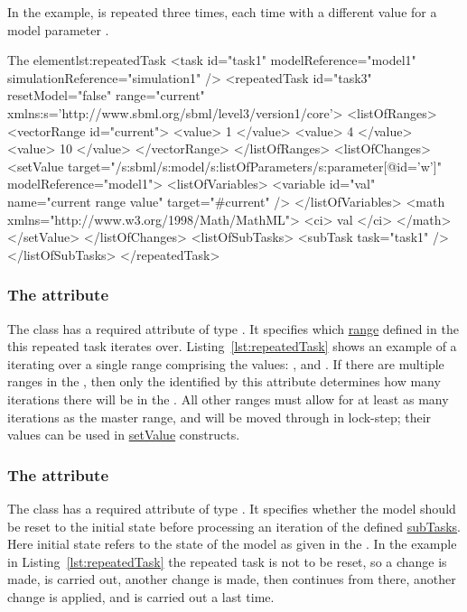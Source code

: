 In the example,  is repeated three times, each time with a different value for a model parameter .
\begin{myXmlLst}{The  element}{lst:repeatedTask}
<task id="task1" modelReference="model1" simulationReference="simulation1" />
<repeatedTask id="task3" resetModel="false" range="current"
    xmlns:s='http://www.sbml.org/sbml/level3/version1/core'>
  <listOfRanges>
    <vectorRange id="current"> 
        <value> 1 </value> 
        <value> 4 </value> 
        <value> 10 </value> 
    </vectorRange> 
  </listOfRanges>
  <listOfChanges>
     <setValue target="/s:sbml/s:model/s:listOfParameters/s:parameter[@id='w']" modelReference="model1">
       <listOfVariables> 
         <variable id="val" name="current range value" target="#current" /> 
       </listOfVariables> 
       <math xmlns="http://www.w3.org/1998/Math/MathML"> 
         <ci> val </ci> 
       </math> 
     </setValue> 
  </listOfChanges>
  <listOfSubTasks>
    <subTask task="task1" />
  </listOfSubTasks>
</repeatedTask>
\end{myXmlLst}

 

\subsubsection{The  attribute}
\label{sec:rangeAttribute}
The  class has a required attribute  of type .
It specifies which \hyperref[sec:ranges]{range} defined in the  this repeated task iterates over.
Listing~\ref{lst:repeatedTask} shows an example of a  iterating over a single range comprising the values: ,  and .
If there are multiple ranges in the , then only the  identified by this attribute determines how many iterations there will be in the .
All other ranges must allow for at least as many iterations as the master range, and will be moved through in lock-step; their values can be used in \hyperref[class:setValue]{setValue} constructs.

\subsubsection{The  attribute}
\label{sec:resetModel}
The  class has a required attribute  of type . It specifies whether the model should be reset to the initial state before processing an iteration of the defined \hyperref[class:subTask]{subTasks}. Here initial state refers to the state of the model as given in the .  In the example in  Listing~\ref{lst:repeatedTask} the repeated task is not to be reset, so a change is made,  is carried out, another change is made, then  continues from there, another change is applied, and  is carried out a last time.

